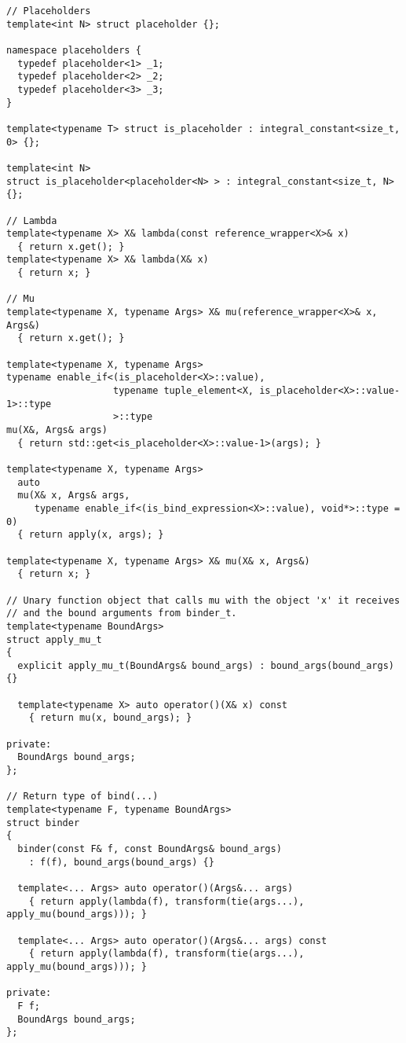 \documentclass{article}
\begin{document}
\small
\begin{verbatim}
// Placeholders
template<int N> struct placeholder {};

namespace placeholders {
  typedef placeholder<1> _1;
  typedef placeholder<2> _2;
  typedef placeholder<3> _3;
}

template<typename T> struct is_placeholder : integral_constant<size_t, 0> {};

template<int N> 
struct is_placeholder<placeholder<N> > : integral_constant<size_t, N> {};

// Lambda
template<typename X> X& lambda(const reference_wrapper<X>& x)
  { return x.get(); }
template<typename X> X& lambda(X& x)
  { return x; }

// Mu
template<typename X, typename Args> X& mu(reference_wrapper<X>& x, Args&)
  { return x.get(); }

template<typename X, typename Args>
typename enable_if<(is_placeholder<X>::value),
                   typename tuple_element<X, is_placeholder<X>::value-1>::type
                   >::type
mu(X&, Args& args)
  { return std::get<is_placeholder<X>::value-1>(args); }

template<typename X, typename Args>
  auto 
  mu(X& x, Args& args, 
     typename enable_if<(is_bind_expression<X>::value), void*>::type = 0)
  { return apply(x, args); }

template<typename X, typename Args> X& mu(X& x, Args&)
  { return x; }

// Unary function object that calls mu with the object 'x' it receives
// and the bound arguments from binder_t.
template<typename BoundArgs>
struct apply_mu_t
{
  explicit apply_mu_t(BoundArgs& bound_args) : bound_args(bound_args) {}

  template<typename X> auto operator()(X& x) const
    { return mu(x, bound_args); }

private:
  BoundArgs bound_args;
};

// Return type of bind(...)
template<typename F, typename BoundArgs>
struct binder
{
  binder(const F& f, const BoundArgs& bound_args)
    : f(f), bound_args(bound_args) {}

  template<... Args> auto operator()(Args&... args)
    { return apply(lambda(f), transform(tie(args...), apply_mu(bound_args))); }

  template<... Args> auto operator()(Args&... args) const
    { return apply(lambda(f), transform(tie(args...), apply_mu(bound_args))); }

private:
  F f;
  BoundArgs bound_args;
};


\end{verbatim}
\end{document}
